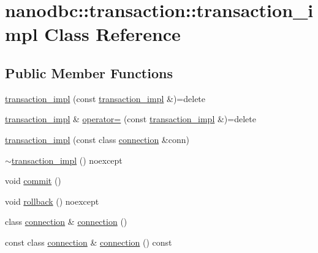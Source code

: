 \hypertarget{classnanodbc_1_1transaction_1_1transaction__impl}{}\section{nanodbc\+::transaction\+::transaction\+\_\+impl Class Reference}
\label{classnanodbc_1_1transaction_1_1transaction__impl}
\subsection*{Public Member Functions}
\begin{DoxyCompactItemize}
\item 
\mbox{\hyperlink{classnanodbc_1_1transaction_1_1transaction__impl_a398a748613a044bbe7575ae89a1d5c99}{transaction\+\_\+impl}} (const \mbox{\hyperlink{classnanodbc_1_1transaction_1_1transaction__impl}{transaction\+\_\+impl}} \&)=delete
\item 
\mbox{\hyperlink{classnanodbc_1_1transaction_1_1transaction__impl}{transaction\+\_\+impl}} \& \mbox{\hyperlink{classnanodbc_1_1transaction_1_1transaction__impl_a29c5809d34dcaa35c0bee9033f626514}{operator=}} (const \mbox{\hyperlink{classnanodbc_1_1transaction_1_1transaction__impl}{transaction\+\_\+impl}} \&)=delete
\item 
\mbox{\hyperlink{classnanodbc_1_1transaction_1_1transaction__impl_a73b82d6fefc494ee13152591dbda51ca}{transaction\+\_\+impl}} (const class \mbox{\hyperlink{classnanodbc_1_1connection}{connection}} \&conn)
\item 
\mbox{\hyperlink{classnanodbc_1_1transaction_1_1transaction__impl_a49c194bdf01ab335ea806691b881d619}{$\sim$transaction\+\_\+impl}} () noexcept
\item 
void \mbox{\hyperlink{classnanodbc_1_1transaction_1_1transaction__impl_a5c46b601dca26ad0c7154a04a209b671}{commit}} ()
\item 
void \mbox{\hyperlink{classnanodbc_1_1transaction_1_1transaction__impl_acfd5581e2b513c9f61666fa6a7098ed6}{rollback}} () noexcept
\item 
class \mbox{\hyperlink{classnanodbc_1_1connection}{connection}} \& \mbox{\hyperlink{classnanodbc_1_1transaction_1_1transaction__impl_ac5772f602bc98cbea32a0ed211cbcfed}{connection}} ()
\item 
const class \mbox{\hyperlink{classnanodbc_1_1connection}{connection}} \& \mbox{\hyperlink{classnanodbc_1_1transaction_1_1transaction__impl_a196843dc2ca5042405b6a601593a658d}{connection}} () const
\end{DoxyCompactItemize}


